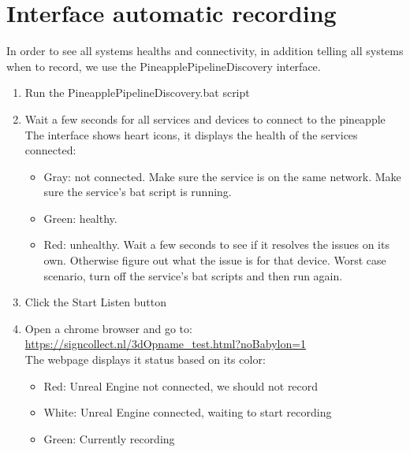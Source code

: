 \section{Interface automatic recording}\label{UI}
In order to see all systems healths and connectivity, in addition telling all systems when to record, we use the PineapplePipelineDiscovery interface.
\begin{enumerate}
    \item Run the PineapplePipelineDiscovery.bat script
    \item Wait a few seconds for all services and devices to connect to the pineapple\\
    The interface shows heart icons, it displays the health of the services connected:
    \begin{itemize}
        \item Gray: not connected. Make sure the service is on the same network. Make sure the service's bat script is running.
        \item Green: healthy.
        \item Red: unhealthy. Wait a few seconds to see if it resolves the issues on its own. Otherwise figure out what the issue is for that device. Worst case scenario, turn off the service's bat scripts and then run again.
    \end{itemize}
    \item Click the Start Listen button
    \item Open a chrome browser and go to: \url{https://signcollect.nl/3dOpname_test.html?noBabylon=1}\\The webpage displays it status based on its color:
    \begin{itemize}
        \item Red: Unreal Engine not connected, we should not record
        \item White: Unreal Engine connected, waiting to start recording
        \item Green: Currently recording
    \end{itemize}
\end{enumerate}
